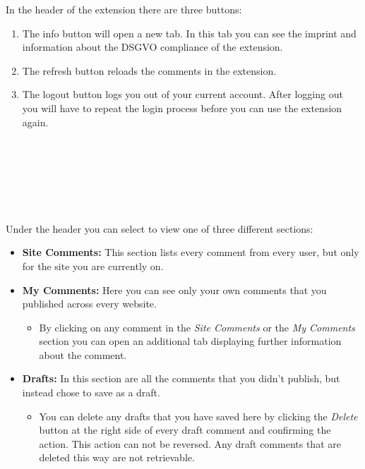 \documentclass{article}
\begin{document}
In the header of the extension there are three buttons: 
\begin{enumerate}
    \item The info button will open a new tab. In this tab you can see the imprint and information about the DSGVO compliance of the extension.
    \item The refresh button reloads the comments in the extension.
    \item The logout button logs you out of your current account. After logging out you will have to repeat the login process before you can use the extension again.\\\\\\\\\\\\\\
\end{enumerate}
Under the header you can select to view one of three different sections:
\begin{itemize}
    \item \textbf{Site Comments:} This section lists every comment from every user, but only for the site you are currently on.
    \item \textbf{My Comments:} Here you can see only your own comments that you published across every website.
        \begin{itemize}
            \item By clicking on any comment in the \textit{Site Comments} or the \textit{My Comments} section you can open an additional tab displaying further information about the comment.
        \end{itemize}
    \item \textbf{Drafts:} In this section are all the comments that you didn't publish, but instead chose to save as a draft.
    \begin{itemize}
        \item You can delete any drafts that you have saved here by clicking the \textit{Delete} button at the right side of every draft comment and confirming the action. This action can not be reversed. Any draft comments that are deleted this way are not retrievable.
    \end{itemize}
\end{itemize}
\end{document}

